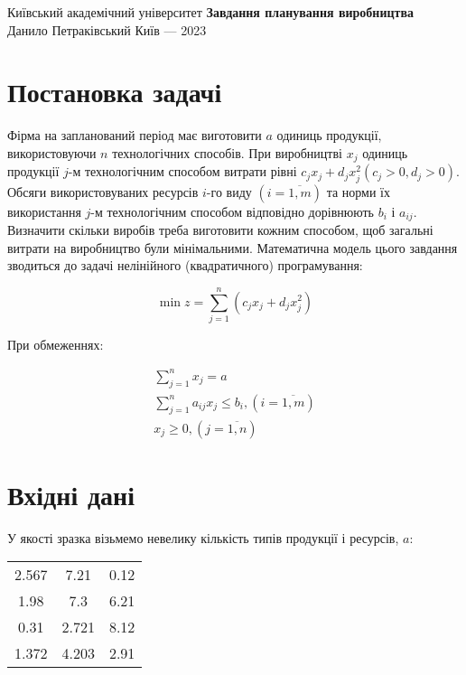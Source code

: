\documentclass[12pt]{report}
\begin{document}
    \begin{titlepage}
        \centering
        Київський академічний університет
        \vfill
        \vspace{0.5cm}
        \huge \textbf{Завдання планування виробництва} \\
        \vspace{0.5cm}
        \normalsize Данило Петраківський
        \vfill
        \normalsize Київ --- 2023
    \end{titlepage}

    \section*{Постановка задачі}\label{sec:problem}

    Фірма на запланований період має виготовити $a$ одиниць продукції, використовуючи $n$ технологічних способів.
    При виробництві $x_j$ одиниць продукції $j$-м технологічним способом витрати рівні
    $c_j x_j + d_j x_j ^ 2 (c_j > 0, d_j > 0)$.
    Обсяги використовуваних ресурсів $i$-го виду $(i = \overline{1, m})$ та норми їх використання $j$-м технологічним
    способом відповідно дорівнюють $b_i$ і $a_{ij}$.
    Визначити скільки виробів треба виготовити кожним способом, щоб загальні витрати на виробництво були мінімальними.
    Математична модель цього завдання зводиться до задачі нелінійного (квадратичного) програмування:

    \[\min z = \sum_{j = 1}^{n} (c_j x_j + d_j x_j ^ 2)\]

    При обмеженнях:

    \begin{gather*}
        \sum_{j = 1}^{n} x_j = a \\
        \sum_{j = 1}^{n} a_{ij} x_j \le b_i, (i = \overline{1, m}) \\
        x_j \ge 0, (j = \overline{1, n})
    \end{gather*}

    \section*{Вхідні дані}\label{sec:input}

    У якості зразка візьмемо невелику кількість типів продукції і ресурсів, $a$:

    \begin{center}
        \begin{tabular}{c c c}
            2.567 & 7.21  & 0.12 \\
            1.98  & 7.3   & 6.21 \\
            0.31  & 2.721 & 8.12 \\
            1.372 & 4.203 & 2.91
        \end{tabular}
    \end{center}
\end{document}
